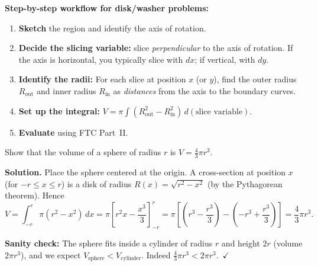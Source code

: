 \textbf{Step-by-step workflow for disk/washer problems:}
\begin{enumerate}[label=(\arabic*), leftmargin=*]
\item \textbf{Sketch} the region and identify the axis of rotation.
\item \textbf{Decide the slicing variable:} slice \emph{perpendicular} to the axis of rotation. If the axis is horizontal, you typically slice with $dx$; if vertical, with $dy$.
\item \textbf{Identify the radii:} For each slice at position $x$ (or $y$), find the outer radius $R_{\text{out}}$ and inner radius $R_{\text{in}}$ as \emph{distances} from the axis to the boundary curves.
\item \textbf{Set up the integral:} $V = \pi\int(R_{\text{out}}^2 - R_{\text{in}}^2)\,d(\text{slice variable})$.
\item \textbf{Evaluate} using FTC Part~II.
\end{enumerate}

\begin{examplebox}[title={Worked Example (Lecture Example 2.3): Volume of a sphere}]
Show that the volume of a sphere of radius $r$ is $V=\frac{4}{3}\pi r^3$.

\textbf{Solution.}
Place the sphere centered at the origin. A cross-section at position $x$ (for $-r\le x\le r$) is a disk of radius $R(x)=\sqrt{r^2-x^2}$ (by the Pythagorean theorem). Hence
\[
V=\int_{-r}^{r}\pi(r^2-x^2)\,dx
=\pi\left[r^2 x-\frac{x^3}{3}\right]_{-r}^{r}
=\pi\left[\left(r^3-\frac{r^3}{3}\right)-\left(-r^3+\frac{r^3}{3}\right)\right]
=\frac{4}{3}\pi r^3.
\]

\textbf{Sanity check:} The sphere fits inside a cylinder of radius $r$ and height $2r$ (volume $2\pi r^3$), and we expect $V_{\text{sphere}}<V_{\text{cylinder}}$. Indeed $\frac{4}{3}\pi r^3 < 2\pi r^3$.\ $\checkmark$
\end{examplebox}


\begin{center}
\end{center}

